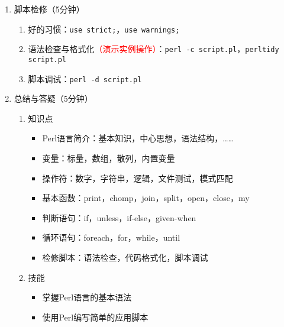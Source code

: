 \documentclass{TIJMUjiaoanLL}
\begin{document}
\begin{enumerate}
  \item 脚本检修（5分钟）
    \begin{enumerate}
      \item 好的习惯：\verb|use strict;|，\verb|use warnings;|
      \item 语法检查与格式化\textcolor{red}{（演示实例操作）}：\verb|perl -c script.pl|，\verb|perltidy script.pl|
      \item 脚本调试：\verb|perl -d script.pl|
    \end{enumerate}
  \item 总结与答疑（5分钟）
    \begin{enumerate}
      \item 知识点
	\begin{itemize}
	  \item Perl语言简介：基本知识，中心思想，语法结构，……
	  \item 变量：标量，数组，散列，内置变量
	  \item 操作符：数字，字符串，逻辑，文件测试，模式匹配
	  \item 基本函数：print，chomp，join，split，open，close，my
    \item 判断语句：if，unless，if-else，given-when
	  \item 循环语句：foreach，for，while，until
	  \item 检修脚本：语法检查，代码格式化，脚本调试
	\end{itemize}
      \item 技能
	\begin{itemize}
	  \item 掌握Perl语言的基本语法
	  \item 使用Perl编写简单的应用脚本
	\end{itemize}
    \end{enumerate}
\end{enumerate}

\otherTail
\end{document}
